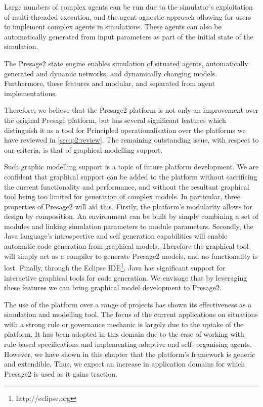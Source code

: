 Large numbers of complex agents can be run due to the simulator's exploitation
of multi-threaded execution, and the agent agnostic approach allowing for users
to implement complex agents in simulations. These agents can also be
automatically generated from input parameters as part of the initial state of
the simulation.

The Presage2 state engine enables simulation of situated agents,
automatically generated and dynamic networks, and dynamically changing models.
Furthermore, these features and modular, and separated from agent
implementations.

Therefore, we believe that the Presage2 platform is not only an improvement over
the original Presage platform, but has several significant features which
distinguish it as a tool for Principled operationalisation over the platforms we
have reviewed in \autoref{sec:p2:review}. The remaining outstanding issue, with
respect to our criteria, is that of graphical modelling support.

Such graphic modelling support is a topic of future platform development. We are
confident that graphical support can be added to the platform without
sacrificing the current functionality and performance, and without the resultant
graphical tool being too limited for generation of complex models. In
particular, three properties of Presage2 will aid this. Firstly, the platform's
modularity allows for design by composition. An environment can be built by
simply combining a set of modules and linking simulation parameters to module
parameters. Secondly, the Java language's introspective and self generation
capabilities will enable automatic code generation from graphical models.
Therefore the graphical tool will simply act as a compiler to generate Presage2
models, and no functionality is lost. Finally, through the Eclipse IDE\footnote{
http://eclipse.org}, Java has significant support for interactive graphical
tools for code generation. We envisage that by leveraging these features we can
bring graphical model development to Presage2.

The use of the platform over a range of projects has shown its effectiveness
as a simulation and modelling tool. The focus of the current applications on
situations with a strong rule or governance mechanic is largely due to the
uptake of the platform. It has been adopted in this domain due to the ease of
working with rule-based specifications and implementing adaptive and self-
organising agents. However, we have shown in this chapter that the platform's
framework is generic and extendible. Thus, we expect an increase in application
domains for which Presage2 is used as it gains traction.



